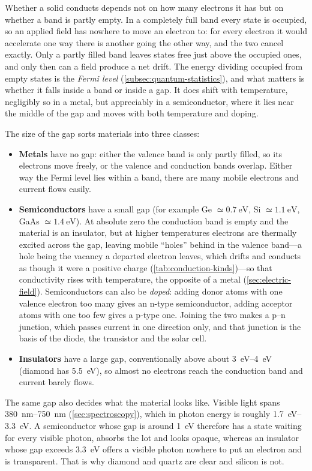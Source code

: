     Whether a solid conducts depends not on how many electrons it has but on whether a band is partly empty. In a completely full band every state is occupied, so an applied field has nowhere to move an electron to: for every electron it would accelerate one way there is another going the other way, and the two cancel exactly. Only a partly filled band leaves states free just above the occupied ones, and only then can a field produce a net drift. The energy dividing occupied from empty states is the \emph{Fermi level} (\cref{subsec:quantum-statistics}), and what matters is whether it falls inside a band or inside a gap. It does shift with temperature, negligibly so in a metal, but appreciably in a semiconductor, where it lies near the middle of the gap and moves with both temperature and doping.

    The size of the gap sorts materials into three classes:

    \begin{itemize}
        \item \textbf{Metals} have no gap: either the valence band is only partly filled, so its electrons move freely, or the valence and conduction bands overlap. Either way the Fermi level lies within a band, there are many mobile electrons and current flows easily.
        \item \textbf{Semiconductors} have a small gap (for example Ge $\simeq\qty{0.7}{\electronvolt}$, Si $\simeq\qty{1.1}{\electronvolt}$, GaAs $\simeq\qty{1.4}{\electronvolt}$). At absolute zero the conduction band is empty and the material is an insulator, but at higher temperatures electrons are thermally excited across the gap, leaving mobile \enquote{holes} behind in the valence band---a hole being the vacancy a departed electron leaves, which drifts and conducts as though it were a positive charge (\cref{tab:conduction-kinds})---so that conductivity rises with temperature, the opposite of a metal (\cref{sec:electric-field}). Semiconductors can also be \emph{doped}: adding donor atoms with one valence electron too many gives an n-type semiconductor, adding acceptor atoms with one too few gives a p-type one. Joining the two makes a p--n junction, which passes current in one direction only, and that junction is the basis of the diode, the transistor and the solar cell.
        \item \textbf{Insulators} have a large gap, conventionally above about \qtyrange{3}{4}{\electronvolt} (diamond has \qty{5.5}{\electronvolt}), so almost no electrons reach the conduction band and current barely flows.
    \end{itemize}

    The same gap also decides what the material looks like. Visible light spans \qtyrange{380}{750}{\nano\metre} (\cref{sec:spectroscopy}), which in photon energy is roughly \qtyrange{1.7}{3.3}{\electronvolt}. A semiconductor whose gap is around \qty{1}{\electronvolt} therefore has a state waiting for every visible photon, absorbs the lot and looks opaque, whereas an insulator whose gap exceeds \qty{3.3}{\electronvolt} offers a visible photon nowhere to put an electron and is transparent. That is why diamond and quartz are clear and silicon is not.